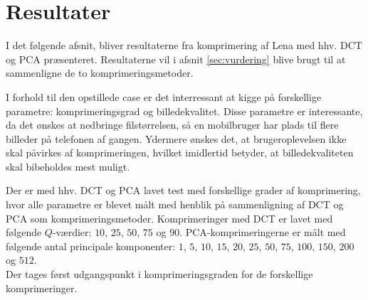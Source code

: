 \chapter{Resultater}\label{chapter:resultater}
I det følgende afsnit, bliver resultaterne fra komprimering af Lena med hhv. DCT og PCA præsenteret. Resultaterne vil i afsnit \ref{sec:vurdering} blive brugt til at sammenligne de to komprimeringsmetoder.

I forhold til den opstillede case er det interressant at kigge på forskellige parametre: komprimeringsgrad og billedekvalitet. Disse parametre er interessante, da det ønskes at nedbringe filstørrelsen, så en mobilbruger har plads til flere billeder på telefonen af gangen. Ydermere ønskes det, at brugeroplevelsen ikke skal påvirkes af komprimeringen, hvilket imidlertid betyder, at billedekvaliteten skal bibeholdes mest muligt.

Der er med hhv. DCT og PCA lavet test med forskellige grader af komprimering, hvor alle parametre er blevet målt med henblik på sammenligning af DCT og PCA som komprimeringsmetoder. Komprimeringer med DCT er lavet med følgende $Q$-værdier: $10$, $25$, $50$, $75$ og $90$. PCA-komprimeringerne er målt med følgende antal principale komponenter: $1$, $5$, $10$, $15$, $20$, $25$, $50$, $75$, $100$, $150$, $200$ og $512$. \\
Der tages først udgangspunkt i komprimeringsgraden for de forskellige komprimeringer.

